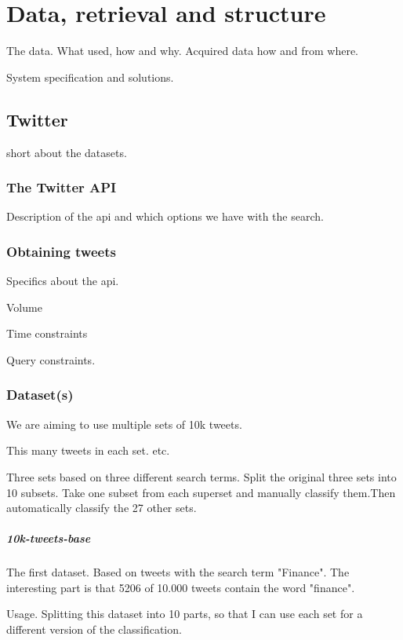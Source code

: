 \chapter{Data, retrieval and structure}
The data. What used, how and why. Acquired data how and from where. 

System specification and solutions. 

\section{Twitter}
short about the datasets. 

\subsection{The Twitter API}
Description of the api and which options we have with the search. 

\subsection{Obtaining tweets} %

Specifics about the api. 

Volume

Time constraints 

Query constraints. 

\subsection{Dataset(s)}
We are aiming to use multiple sets of 10k tweets. 

This many tweets in each set. etc. 

Three sets based on three different search terms.
Split the original three sets into 10 subsets. 
Take one subset from each superset and manually classify them.Then
automatically classify the 27 other sets.  

\paragraph{10k-tweets-base}
The first dataset.
Based on tweets with the search term "Finance". 
The interesting part is that 5206 of 10.000 tweets contain the word "finance".

Usage. Splitting this dataset into 10 parts, so that I can use each set for a
different version of the classification. 

